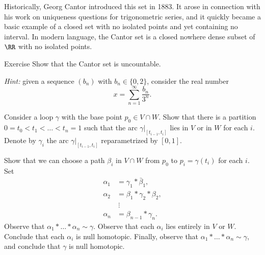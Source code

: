 Historically, Georg Cantor introduced this set in 1883.
It arose in connection with his work on uniqueness questions for trigonometric series, and it quickly became a basic example of a closed set with no isolated points and yet containing no interval.
In modern language, the Cantor set is a closed nowhere dense subset of~$\RR$ with no isolated points.

\begin{thm}{Exercise}\label{ex:cantor-uncountable}
Show that the Cantor set is uncountable.

\textit{Hint:}
given a sequence $(b_n)$ with $b_n\in\{0,2\}$, consider the real number
\[
x=\sum_{n=1}^\infty \frac{b_n}{3^n}.
\]
\end{thm}


















Consider a loop $\gamma$ with the base point $p_0\in V\cap W$.
Show that there is a partition $0=t_0<t_1<\ldots<t_n=1$ such that the arc $\gamma|_{[t_{i-1},t_i]}$ lies in $V$ or in $W$ for each $i$.
Denote by $\gamma_i$ the arc $\gamma|_{[t_{i-1},t_i]}$ reparametrized by $[0,1]$.

Show that we can choose a path $\beta_i$ in $V\cap W$ from $p_0$ to $p_i=\gamma(t_i)$ for each $i$.
Set
\begin{align*}
\alpha_1&=\gamma_1*\bar\beta_1,
\\
\alpha_2&=\beta_1*\gamma_2*\beta_2,
\\
&\ \vdots
\\
\alpha_n&=\beta_{n-1}*\gamma_n.
\end{align*}
Observe that $\alpha_1*\dots*\alpha_n\sim \gamma$.
Observe that each $\alpha_i$ lies entirely in $V$ or $W$.
Conclude that each $\alpha_i$ is null homotopic.
Finally, observe that $\alpha_1*\dots*\alpha_n\sim \gamma$, and conclude that $\gamma$ is null homotopic.






















